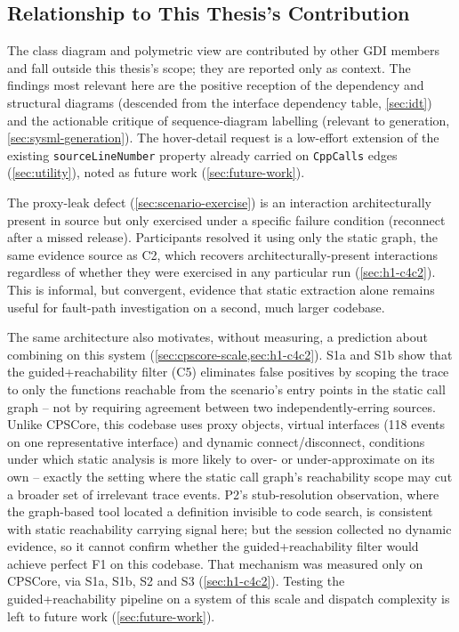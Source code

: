 \subsection{Relationship to This Thesis's Contribution}

The class diagram and polymetric view are contributed by other \ac{GDI}
members and fall outside this thesis's scope; they are reported only as
context. The findings most relevant here are the positive reception of
the dependency and structural diagrams (descended from the interface
dependency table, \cref{sec:idt}) and the actionable critique of
sequence-diagram labelling (relevant to \sysml generation,
\cref{sec:sysml-generation}). The hover-detail request is a low-effort
extension of the existing \texttt{sourceLineNumber} property already
carried on \texttt{CppCalls} edges (\cref{sec:utility}), noted as future
work (\cref{sec:future-work}).

The proxy-leak defect (\cref{sec:scenario-exercise}) is an interaction
architecturally present in source but only exercised under a specific
failure condition (reconnect after a missed release). Participants
resolved it using only the static graph, the same evidence source as
C2, which recovers architecturally-present interactions regardless of
whether they were exercised in any particular run
(\cref{sec:h1-c4c2}). This is informal, but convergent, evidence that
static extraction alone remains useful for fault-path investigation on a
second, much larger codebase.

The same architecture also motivates, without measuring, a prediction
about combining on this system (\cref{sec:cpscore-scale,sec:h1-c4c2}).
S1a and S1b show that the guided+reachability filter (C5) eliminates
false positives by scoping the trace to only the functions reachable
from the scenario's entry points in the static call graph -- not by
requiring agreement between two independently-erring sources. Unlike
CPSCore, this codebase uses proxy objects, virtual interfaces (118
events on one representative interface) and dynamic
connect/disconnect, conditions under which static analysis is more
likely to over- or under-approximate on its own -- exactly the setting
where the static call graph's reachability scope may cut a broader set
of irrelevant trace events. P2's stub-resolution observation, where the
graph-based tool located a definition invisible to code search, is
consistent with static reachability carrying signal here; but the
session collected no dynamic evidence, so it cannot confirm whether
the guided+reachability filter would achieve perfect F1 on this
codebase. That mechanism was measured only on CPSCore, via S1a, S1b,
S2 and S3 (\cref{sec:h1-c4c2}). Testing the guided+reachability
pipeline on a system of this scale and dispatch complexity is left to
future work (\cref{sec:future-work}).

